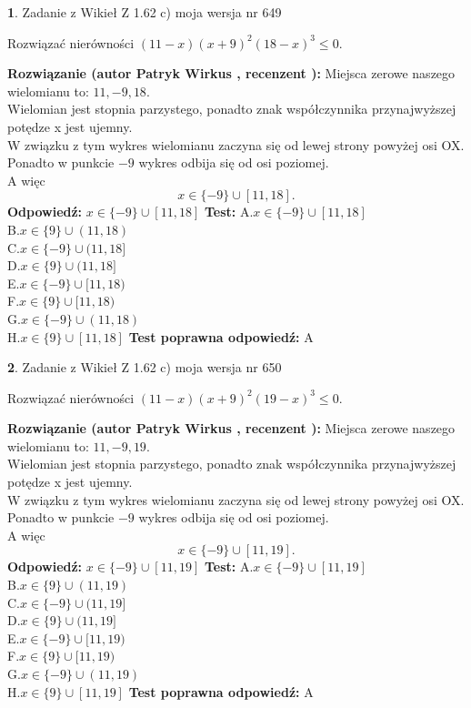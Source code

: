 \documentclass[12pt, a4paper]{article}
\theoremstyle{definition} %
\newtheorem{zad}{}
\newcommand{\zadStart}[1]{\begin{zad}#1\newline}
\newcommand{\zadStop}{\end{zad}}
\newcommand{\rozwStart}[2]{\noindent \textbf{Rozwiązanie (autor #1 , recenzent #2): }\newline}
\newcommand{\rozwStop}{\newline}
\newcommand{\odpStart}{\noindent \textbf{Odpowiedź:}\newline}
\newcommand{\odpStop}{\newline}
\newcommand{\testStart}{\noindent \textbf{Test:}\newline}
\newcommand{\testStop}{\newline}
\newcommand{\kluczStart}{\noindent \textbf{Test poprawna odpowiedź:}\newline}
\newcommand{\kluczStop}{\newline}
\begin{document}
\zadStart{Zadanie z Wikieł Z 1.62 c) moja wersja nr 649}

Rozwiązać nierówności $(11-x)(x+9)^{2}(18-x)^{3}\le0$.
\zadStop
\rozwStart{Patryk Wirkus}{}
Miejsca zerowe naszego wielomianu to: $11, -9, 18$.\\
Wielomian jest stopnia parzystego, ponadto znak współczynnika przy\linebreak najwyższej potędze x jest ujemny.\\ W związku z tym wykres wielomianu zaczyna się od lewej strony powyżej osi OX.\\
Ponadto w punkcie $-9$ wykres odbija się od osi poziomej.\\
A więc $$x \in \{-9\} \cup [11,18].$$
\rozwStop
\odpStart
$x \in \{-9\} \cup [11,18]$
\odpStop
\testStart
A.$x \in \{-9\} \cup [11,18]$\\
B.$x \in \{9\} \cup (11,18)$\\
C.$x \in \{-9\} \cup (11,18]$\\
D.$x \in \{9\} \cup (11,18]$\\
E.$x \in \{-9\} \cup [11,18)$\\
F.$x \in \{9\} \cup [11,18)$\\
G.$x \in \{-9\} \cup (11,18)$\\
H.$x \in \{9\} \cup [11,18]$
\testStop
\kluczStart
A
\kluczStop



\zadStart{Zadanie z Wikieł Z 1.62 c) moja wersja nr 650}

Rozwiązać nierówności $(11-x)(x+9)^{2}(19-x)^{3}\le0$.
\zadStop
\rozwStart{Patryk Wirkus}{}
Miejsca zerowe naszego wielomianu to: $11, -9, 19$.\\
Wielomian jest stopnia parzystego, ponadto znak współczynnika przy\linebreak najwyższej potędze x jest ujemny.\\ W związku z tym wykres wielomianu zaczyna się od lewej strony powyżej osi OX.\\
Ponadto w punkcie $-9$ wykres odbija się od osi poziomej.\\
A więc $$x \in \{-9\} \cup [11,19].$$
\rozwStop
\odpStart
$x \in \{-9\} \cup [11,19]$
\odpStop
\testStart
A.$x \in \{-9\} \cup [11,19]$\\
B.$x \in \{9\} \cup (11,19)$\\
C.$x \in \{-9\} \cup (11,19]$\\
D.$x \in \{9\} \cup (11,19]$\\
E.$x \in \{-9\} \cup [11,19)$\\
F.$x \in \{9\} \cup [11,19)$\\
G.$x \in \{-9\} \cup (11,19)$\\
H.$x \in \{9\} \cup [11,19]$
\testStop
\kluczStart
A
\kluczStop
\end{document}
